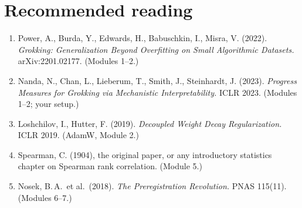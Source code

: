 \documentclass[11pt,a4paper,oneside,openany]{report}
\begin{document}
\chapter*{Recommended reading}
\begin{sloppypar}
\begin{enumerate}
\item[{[1]}] Power, A., Burda, Y., Edwards, H., Babuschkin, I., Misra, V. (2022). \emph{Grokking: Generalization Beyond Overfitting on Small Algorithmic Datasets.} arXiv:2201.02177. (Modules 1--2.)
\item[{[2]}] Nanda, N., Chan, L., Lieberum, T., Smith, J., Steinhardt, J. (2023). \emph{Progress Measures for Grokking via Mechanistic Interpretability.} ICLR 2023. (Modules 1--2; your setup.)
\item[{[3]}] Loshchilov, I., Hutter, F. (2019). \emph{Decoupled Weight Decay Regularization.} ICLR 2019. (AdamW, Module 2.)
\item[{[4]}] Spearman, C. (1904), the original paper, or any introductory statistics chapter on Spearman rank correlation. (Module 5.)
\item[{[5]}] Nosek, B.\,A.\ et al.\ (2018). \emph{The Preregistration Revolution.} PNAS 115(11). (Modules 6--7.)
\end{enumerate}
\end{sloppypar}
\end{document}
